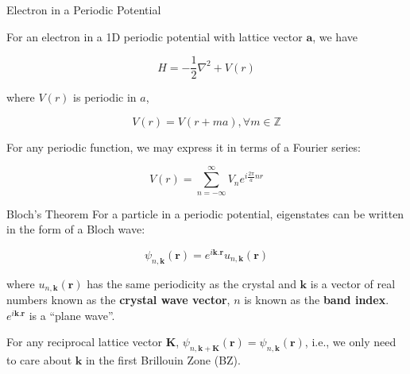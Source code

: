 \documentclass[aspectratio=169]{beamer}
\let \vec \mathbf
\begin{document}
\begin{frame}{Electron in a Periodic Potential}

For an electron in a 1D periodic potential with lattice vector $\vec{a}$, we have

\begin{equation*}
    H = - \frac{1}{2} \nabla^2 + V(r)
\end{equation*}

where $V(r)$ is periodic in $a$,

\begin{equation*}
    V(r) = V(r + ma), \forall m \in \mathbb{Z}
\end{equation*}

For any periodic function, we may express it in terms of a Fourier series:

\begin{equation*}
    V(r) = \sum_{n=-\infty}^{\infty} V_n e^{i\frac{2\pi}{a}nr}
\end{equation*}


\end{frame} 

\begin{frame}{Bloch's Theorem}
For a particle in a periodic potential, eigenstates can be written in the form of a Bloch wave:

\begin{equation*}
\psi_{n,\vec{k}}(\vec{r}) = e^{i\vec{k}.\vec{r}}u_{n,\vec{k}}(\vec{r})
\end{equation*} 

where $u_{n,\vec{k}}(\vec{r})$ has the same periodicity as the crystal and $\vec{k}$ is a vector of real numbers known as the \textbf{crystal wave vector}, $n$ is known as the \textbf{band index}. $e^{i\vec{k}.\vec{r}}$ is a ``plane wave''.\newline
\newline

For any reciprocal lattice vector $\vec{K}$, $\psi_{n,\vec{k}+\vec{K}}(\vec{r}) = \psi_{n,\vec{k}}(\vec{r})$, i.e., we only need to care about $\vec{k}$ in the first Brillouin Zone (BZ).

\end{frame} 
\end{document}
